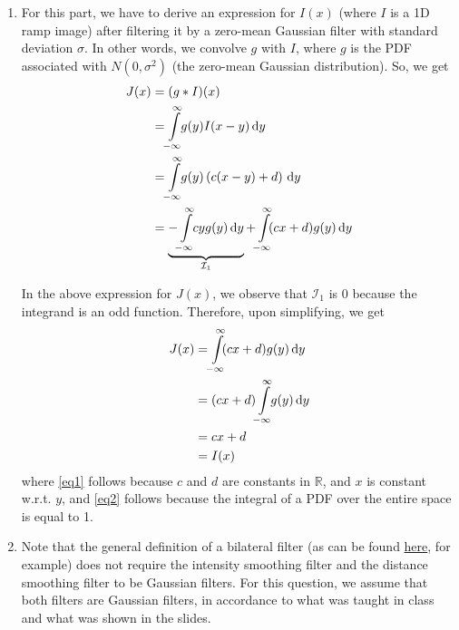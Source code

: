 \documentclass[a4paper]{article}
\newcommand{\R}{\mathbb{R}}
\begin{document}
\begin{enumerate}
\item For this part, we have to derive an expression for $I(x)$ (where $I$ is a 1D ramp image) after filtering it by a zero-mean Gaussian filter with standard deviation $\sigma$. In other words, we convolve $g$ with $I$, where $g$ is the PDF associated with $N(0, \sigma^2)$ (the zero-mean Gaussian distribution). So, we get
\begin{align*}
J(x) &= (g * I)(x) \\
&= \int\limits_{\mathclap{-\infty}}^{\mathclap{\infty}}\! g(y) I (x - y)\, \mathrm{d}y \\
&= \int\limits_{\mathclap{-\infty}}^{\mathclap{\infty}}\! g(y)\left ( c(x - y) + d\right )\, \mathrm{d}y \\
&= \underbrace{-\int\limits_{\mathclap{-\infty}}^{\mathclap{\infty}}\! c y g(y)\, \mathrm{d}y}_{\mathcal{I}_1} + \int\limits_{\mathclap{-\infty}}^{\mathclap{\infty}}\! (cx + d)g(y)\, \mathrm{d}y
\end{align*}

In the above expression for $J(x)$, we observe that $\mathcal{I}_1$ is 0 because the integrand is an odd function. Therefore, upon simplifying, we get
\begin{align}
J(x) &= \int\limits_{\mathclap{-\infty}}^{\mathclap{\infty}}\! (cx + d)g(y)\, \mathrm{d}y \nonumber \\
&=  (cx + d)\int\limits_{\mathclap{-\infty}}^{\mathclap{\infty}}\!g(y)\, \mathrm{d}y \label{eq1} \\
&= cx + d \label{eq2}\\
&= I(x)
\end{align}
where \eqref{eq1} follows because $c$ and $d$ are constants in $\R$, and $x$ is constant w.r.t. $y$, and \eqref{eq2} follows because the integral of a PDF over the entire space is equal to 1.

\item Note that the general definition of a bilateral filter (as can be found \href{https://en.wikipedia.org/wiki/Bilateral_filter#Definition}{here}, for example) does not require the intensity smoothing filter and the distance smoothing filter to be Gaussian filters. For this question, we assume that both filters are Gaussian filters, in accordance to what was taught in class and what was shown in the slides.


\end{enumerate}
\end{document}
